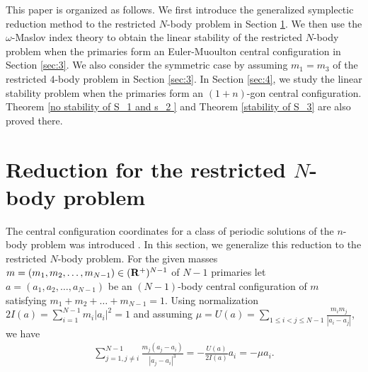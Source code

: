\documentclass[11pt]{article}
\def\R{{\bf R}}
\def\om{{\omega}}
\begin{document}
This paper is organized as follows. We first introduce the generalized symplectic reduction method to the restricted $N$-body problem in Section \ref{sec:2}. We then use the $\om$-Maslov index theory to obtain the linear stability of the restricted $N$-body problem
when the primaries form an Euler-Muoulton central configuration in Section \ref{sec:3}. We also consider the symmetric case by assuming $m_1 = m_3$
of the restricted $4$-body problem in Section \ref{sec:3}. In Section \ref{sec:4}, we study the linear stability problem when the primaries form an $(1+n)$-gon central configuration.
Theorem \ref{no stability of S_1 and s_2 }
and Theorem \ref{stability of S_3}
are also proved there.


\setcounter{equation}{0}%
\section{Reduction for the restricted \texorpdfstring{$N$}{N}-body problem}\label{sec:2}
The central configuration coordinates
for a class of periodic solutions of the $n$-body problem was introduced \cite{MS}. 
In this section, we generalize this reduction to the restricted $N$-body problem.
For the given masses $m=(m_1,m_2,\ldots,m_{N-1})\in (\R^+)^{N-1}$
of $N-1$ primaries
let $a=(a_1,a_2,\ldots,a_{N -1})$ be an $(N - 1)$-body central configuration of $m$  satisfying $m_1+m_2+\ldots+m_{N-1}=1$.
Using normalization $2I(a) = \sum_{i = 1}^{N-1}m_i |a_i|^2 = 1$ and assuming  $\mu = U(a) = \sum_{1\le i<j\le N-1}\frac{m_im_j}{|a_i-a_j|}$, we have
\begin{align}
  \sum_{j=1,j\ne i}^{N-1}\frac{m_j(a_{j}-a_{i})}{|a_{j}-a_{i}|^3}
          = -\frac{U(a)}{2I(a)}a_{i}=-\mu a_{i}.    \label{eq.of.cc}
\end{align}
\end{document}
